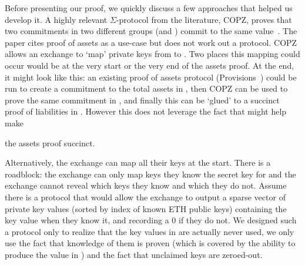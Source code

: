 Before presenting our \bootstrap proof, we quickly discuss a few approaches that helped us develop it. A highly relevant $\Sigma$-protocol from the literature, COPZ, proves that two commitments in two different groups (\eg \secp and \bls) commit to the same value~\cite{chase22}. The paper cites proof of assets as a use-case but does not work out a protocol. COPZ allows an exchange to `map' private keys from \secp to \bls. Two places this mapping could occur would be at the very start or the very end of the assets proof. At the end, it might look like this: an existing proof of assets protocol (\eg Provisions~\cite{provisions}) could be run to create a commitment to the total assets in \secp, then COPZ can be used to prove the same commitment in \bls, and finally this can be `glued' to a succinct proof of liabilities in \bls. However this does not leverage the fact that \bls might help make 

\FloatBarrier

\FloatBarrier

the assets proof succinct.

Alternatively, the exchange can map all their keys at the start. There is a roadblock: the exchange can only map keys they know the secret key for and the exchange cannot reveal which keys they know and which they do not. Assume there is a protocol that would allow the exchange to output a sparse vector of \bls private key values (sorted by index of known ETH public keys) containing the key value when they know it, and recording a 0 if they do not. We designed such a protocol only to realize that the key values in \bls are actually never used, we only use the fact that knowledge of them is proven (which is covered by the ability to produce the value in \bls) and the fact that unclaimed keys are zeroed-out. 

